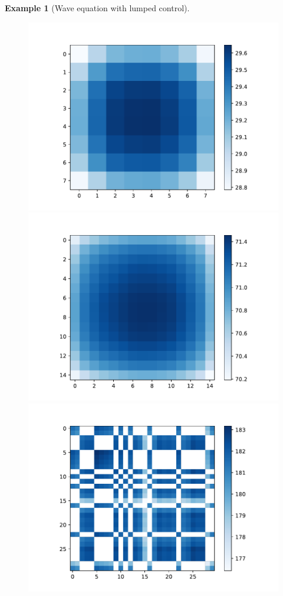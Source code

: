 \documentclass[11pt, a4paper, reqno]{amsart}
\theoremstyle{plain}
\numberwithin{equation}{section}
\newtheorem{example}{Example}[section]
\begin{document}
\begin{example}[Wave equation with lumped control]
	\begin{figure}	
	\includegraphics[scale=0.35]{figures/heat_mat-8d}
	\hspace{0.1cm}
	\includegraphics[scale=0.35]{figures/heat_mat-15d}
	\hspace{0.1cm}
	\includegraphics[scale=0.35]{figures/heat_mat-30d}
	\vspace{0.25cm}
	

\end{figure}
\end{example}
\end{document}
